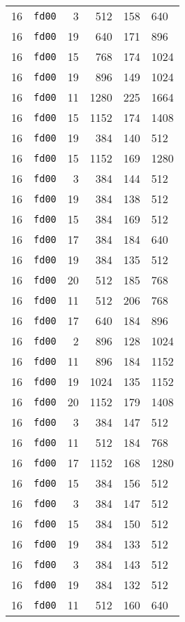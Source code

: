 \documentclass{article}
\begin{document}
\begin{table}[h!]
\begin{tabular}{llrrrl}
    16 & \texttt{fd00} & 3 & 512 & 158 & 640 \\
    16 & \texttt{fd00} & 19 & 640 & 171 & 896 \\
    16 & \texttt{fd00} & 15 & 768 & 174 & 1024 \\
    16 & \texttt{fd00} & 19 & 896 & 149 & 1024 \\
    16 & \texttt{fd00} & 11 & 1280 & 225 & 1664 \\
    16 & \texttt{fd00} & 15 & 1152 & 174 & 1408 \\
    16 & \texttt{fd00} & 19 & 384 & 140 & 512 \\
    16 & \texttt{fd00} & 15 & 1152 & 169 & 1280 \\
    16 & \texttt{fd00} & 3 & 384 & 144 & 512 \\
    16 & \texttt{fd00} & 19 & 384 & 138 & 512 \\
    16 & \texttt{fd00} & 15 & 384 & 169 & 512 \\
    16 & \texttt{fd00} & 17 & 384 & 184 & 640 \\
    16 & \texttt{fd00} & 19 & 384 & 135 & 512 \\
    16 & \texttt{fd00} & 20 & 512 & 185 & 768 \\
    16 & \texttt{fd00} & 11 & 512 & 206 & 768 \\
    16 & \texttt{fd00} & 17 & 640 & 184 & 896 \\
    16 & \texttt{fd00} & 2 & 896 & 128 & 1024 \\
    16 & \texttt{fd00} & 11 & 896 & 184 & 1152 \\
    16 & \texttt{fd00} & 19 & 1024 & 135 & 1152 \\
    16 & \texttt{fd00} & 20 & 1152 & 179 & 1408 \\
    16 & \texttt{fd00} & 3 & 384 & 147 & 512 \\
    16 & \texttt{fd00} & 11 & 512 & 184 & 768 \\
    16 & \texttt{fd00} & 17 & 1152 & 168 & 1280 \\
    16 & \texttt{fd00} & 15 & 384 & 156 & 512 \\
    16 & \texttt{fd00} & 3 & 384 & 147 & 512 \\
    16 & \texttt{fd00} & 15 & 384 & 150 & 512 \\
    16 & \texttt{fd00} & 19 & 384 & 133 & 512 \\
    16 & \texttt{fd00} & 3 & 384 & 143 & 512 \\
    16 & \texttt{fd00} & 19 & 384 & 132 & 512 \\
    16 & \texttt{fd00} & 11 & 512 & 160 & 640 \\

\end{tabular}
\end{table}
\end{document}
